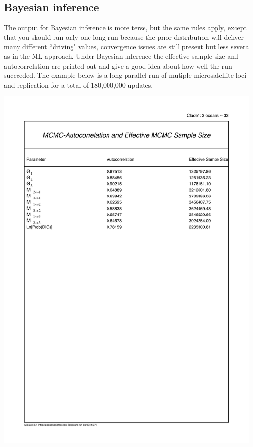 \subsection{Bayesian inference}
The output for Bayesian inference is more terse, but the same rules apply, except that you should run only one long run because the prior distribution
will deliver many different ``driving" values, convergence issues are still present but less severa as in the ML approach. Under Bayesian inference the effective
sample size and autocorrelation are printed out and give a good idea about how well the run succeeded. The example below is a long parallel run of mutiple microsatellite loci and replication for a total of 180,000,000 updates.
\begin{center}
\includegraphics[width=\textwidth]{mim/ess_auto}
\end{center}
\vskip 1cm
